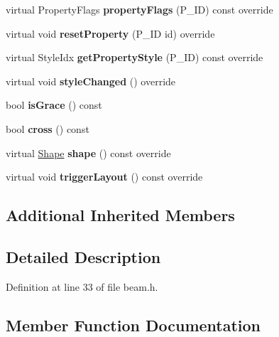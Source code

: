 \begin{DoxyCompactItemize}
\item 
\mbox{\label{class_ms_1_1_beam_a12f99c6dd08a2813142108e3c4095d0d}} 
virtual Property\+Flags {\bfseries property\+Flags} (P\+\_\+\+ID) const override
\item 
\mbox{\label{class_ms_1_1_beam_a990a62ab867b7004f0cf867d0dd0b356}} 
virtual void {\bfseries reset\+Property} (P\+\_\+\+ID id) override
\item 
\mbox{\label{class_ms_1_1_beam_a5ec807f7422e3b1f1534c11e7a57d6e1}} 
virtual Style\+Idx {\bfseries get\+Property\+Style} (P\+\_\+\+ID) const override
\item 
\mbox{\label{class_ms_1_1_beam_a38194020e76fe9e6e062b0f1c6be4c44}} 
virtual void {\bfseries style\+Changed} () override
\item 
\mbox{\label{class_ms_1_1_beam_aa55b7c9dd5fa3d25258f9654bab6fe28}} 
bool {\bfseries is\+Grace} () const
\item 
\mbox{\label{class_ms_1_1_beam_ad4f30020049f6fba843ecfcdd53ba269}} 
bool {\bfseries cross} () const
\item 
\mbox{\label{class_ms_1_1_beam_ac37a399fd8a6345dc97fbb4f1f822d6c}} 
virtual \hyperlink{class_ms_1_1_shape}{Shape} {\bfseries shape} () const override
\item 
\mbox{\label{class_ms_1_1_beam_a00091e9fdd527d690f55a09d600b12e7}} 
virtual void {\bfseries trigger\+Layout} () const override
\end{DoxyCompactItemize}
\subsection*{Additional Inherited Members}


\subsection{Detailed Description}


Definition at line 33 of file beam.\+h.



\subsection{Member Function Documentation}
\mbox{\label{class_ms_1_1_beam_a4ef234c092024c3b6c0c0039ce27c6c9}} 

